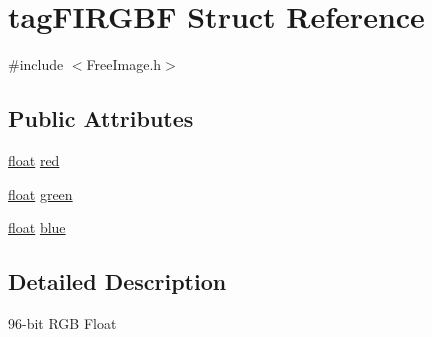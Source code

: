 \hypertarget{structtag_f_i_r_g_b_f}{\section{tag\-F\-I\-R\-G\-B\-F Struct Reference}
\label{structtag_f_i_r_g_b_f}
}


{\ttfamily \#include $<$Free\-Image.\-h$>$}

\subsection*{Public Attributes}
\begin{DoxyCompactItemize}
\item 
\hyperlink{fmod_8h_aeb841aa4b4b5f444b5d739d865b420af}{float} \hyperlink{structtag_f_i_r_g_b_f_ab15fa4a5afe84d7d66e598a1c1a17ffa}{red}
\item 
\hyperlink{fmod_8h_aeb841aa4b4b5f444b5d739d865b420af}{float} \hyperlink{structtag_f_i_r_g_b_f_ac062604601e6b4da84deb02a29287774}{green}
\item 
\hyperlink{fmod_8h_aeb841aa4b4b5f444b5d739d865b420af}{float} \hyperlink{structtag_f_i_r_g_b_f_a18cf7966f5a4f5ffd0820aa5a18f8362}{blue}
\end{DoxyCompactItemize}


\subsection{Detailed Description}
96-\/bit R\-G\-B Float 

